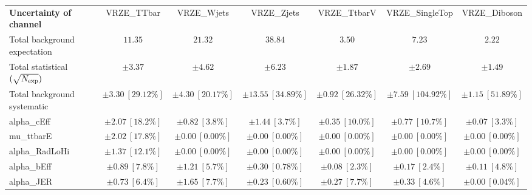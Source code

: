 
\begin{sidewaystable}
\begin{center}
\setlength{\tabcolsep}{0.0pc}
\begin{tabular*}{\textwidth}{@{\extracolsep{\fill}}lcccccc}
\noalign{\smallskip}\hline\noalign{\smallskip}
{\bf Uncertainty of channel}                                    & VRZE\_TTbar            & VRZE\_Wjets            & VRZE\_Zjets            & VRZE\_TtbarV            & VRZE\_SingleTop            & VRZE\_Diboson            \\
\noalign{\smallskip}\hline\noalign{\smallskip}
Total background expectation             &  $11.35$        &  $21.32$        &  $38.84$        &  $3.50$        &  $7.23$        &  $2.22$       \\
\noalign{\smallskip}\hline\noalign{\smallskip}
Total statistical $(\sqrt{N_{\rm exp}})$              & $\pm 3.37$        & $\pm 4.62$        & $\pm 6.23$        & $\pm 1.87$        & $\pm 2.69$        & $\pm 1.49$       \\
Total background systematic               & $\pm 3.30\ [29.12\%] $        & $\pm 4.30\ [20.17\%] $        & $\pm 13.55\ [34.89\%] $        & $\pm 0.92\ [26.32\%] $        & $\pm 7.59\ [104.92\%] $        & $\pm 1.15\ [51.89\%] $             \\
\noalign{\smallskip}\hline\noalign{\smallskip}
\noalign{\smallskip}\hline\noalign{\smallskip}
alpha\_cEff         & $\pm 2.07\ [18.2\%] $          & $\pm 0.82\ [3.8\%] $          & $\pm 1.44\ [3.7\%] $          & $\pm 0.35\ [10.0\%] $          & $\pm 0.77\ [10.7\%] $          & $\pm 0.07\ [3.3\%] $       \\
mu\_ttbarE         & $\pm 2.02\ [17.8\%] $          & $\pm 0.00\ [0.00\%] $          & $\pm 0.00\ [0.00\%] $          & $\pm 0.00\ [0.00\%] $          & $\pm 0.00\ [0.00\%] $          & $\pm 0.00\ [0.00\%] $       \\
alpha\_RadLoHi         & $\pm 1.37\ [12.1\%] $          & $\pm 0.00\ [0.00\%] $          & $\pm 0.00\ [0.00\%] $          & $\pm 0.00\ [0.00\%] $          & $\pm 0.00\ [0.00\%] $          & $\pm 0.00\ [0.00\%] $       \\
alpha\_bEff         & $\pm 0.89\ [7.8\%] $          & $\pm 1.21\ [5.7\%] $          & $\pm 0.30\ [0.78\%] $          & $\pm 0.08\ [2.3\%] $          & $\pm 0.17\ [2.4\%] $          & $\pm 0.11\ [4.8\%] $       \\
alpha\_JER         & $\pm 0.73\ [6.4\%] $          & $\pm 1.65\ [7.7\%] $          & $\pm 0.23\ [0.60\%] $          & $\pm 0.27\ [7.7\%] $          & $\pm 0.33\ [4.6\%] $          & $\pm 0.00\ [0.04\%] $       \\

\end{tabular*}
\end{center}
\end{sidewaystable}
